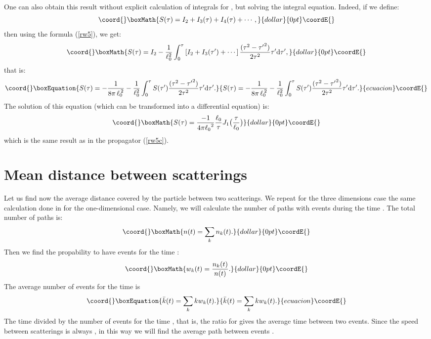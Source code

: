 \documentclass[a4paper,12pt]{article}
\providecommand{\dd}{\text{d}}%
\begin{document}
One can also obtain this result without explicit calculation of
integrals for \coordHE{}, but solving the integral equation. Indeed, if
we define:
$$\coord{}\boxMath{
S(\tau)=I_2+I_3(\tau)+I_4(\tau)+\cdots,
}{dollar}{0pt}\coordE{}$$
then using the formula (\ref{rw5}), we get:
$$\coord{}\boxMath{
S(\tau)=I_2-\dfrac{1}{\ell_{0}^{2}} \int_{0}^{\tau}
\left[I_2+I_3(\tau')+\cdots\right]\dfrac{(\tau
^{2}-{\tau^{\prime}}^{2})}{2 \tau^{2}}\tau^{\prime}\dd
{\tau^{\prime}},
}{dollar}{0pt}\coordE{}$$
that is:
\begin{equation}\coord{}\boxEquation{\label{rw5d}
S(\tau)=-\dfrac{1}{8\pi\,{\ell_{0}}^{\!\!2}}-\dfrac{1}{\ell_{0}^{2}}
\int_{0}^{\tau} S(\tau')\dfrac{(\tau ^{2}-{\tau^{\prime}}^{2})}{2
\tau^{2}}\tau^{\prime}\dd {\tau^{\prime}}.
}{S(\tau)=-\dfrac{1}{8\pi\,{\ell_{0}}^{\!\!2}}-\dfrac{1}{\ell_{0}^{2}}
\int_{0}^{\tau} S(\tau')\dfrac{(\tau ^{2}-{\tau^{\prime}}^{2})}{2
\tau^{2}}\tau^{\prime}\dd {\tau^{\prime}}.
}{ecuacion}\coordE{}\end{equation}
The solution of this equation (which can be transformed into a
differential equation) is: $$\coord{}\boxMath{S(\tau)= \frac{-1}{4\pi{\ell_{0}}^{2}}
\frac{\ell_{0}}{\tau} J_{1}\bigl(\frac{\tau}{\ell_{0}}\bigr)}{dollar}{0pt}\coordE{}$$
which is the same result as in the propagator (\ref{rw5c}).

\section{Mean distance between scatterings}\label{md}
Let us find now the average distance covered by the particle  between
two scatterings.
We repeat for the three dimensions case the same calculation
done in  \cite{Karmanov93} for the one-dimensional case. Namely,  we
will calculate
the number of paths \coordHE{} with \coordHE{} events
during  the time \coordHE{}. The total number of paths is:
$$\coord{}\boxMath{n(t)=\sum_k n_k(t).}{dollar}{0pt}\coordE{}$$
Then we find the propability to have \coordHE{} events for the
time \coordHE{}: $$\coord{}\boxMath{w_k(t) = \dfrac{n_k(t)}{n(t)}.}{dollar}{0pt}\coordE{}$$ The average number of
events for the time
\coordHE{} is
\begin{equation}\coord{}\boxEquation{\label{eq0}
\bar{k}(t)=\sum_k k w_k(t).
}{\bar{k}(t)=\sum_k k w_k(t).
}{ecuacion}\coordE{}\end{equation}
The time \coordHE{} divided by the number of events for the time \coordHE{}, that is,
the ratio \coordHE{} for
\coordHE{} gives the  average time between two events. Since the speed
between scatterings is always  \coordHE{}, in this way we will find the  average
path between events \coordHE{}.
\end{document}
